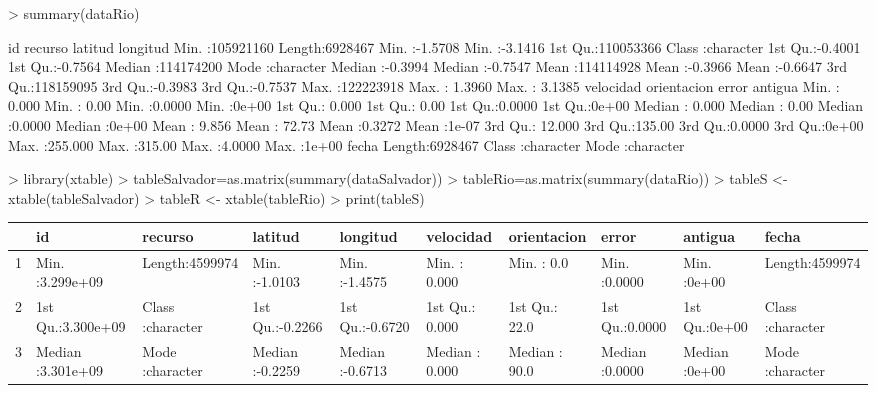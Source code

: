 \documentclass{article}
\begin{document}
\begin{Schunk}
\begin{Sinput}
> summary(dataRio)
\end{Sinput}
\begin{Soutput}
       id              recurso             latitud           longitud      
 Min.   :105921160   Length:6928467     Min.   :-1.5708   Min.   :-3.1416  
 1st Qu.:110053366   Class :character   1st Qu.:-0.4001   1st Qu.:-0.7564  
 Median :114174200   Mode  :character   Median :-0.3994   Median :-0.7547  
 Mean   :114114928                      Mean   :-0.3966   Mean   :-0.6647  
 3rd Qu.:118159095                      3rd Qu.:-0.3983   3rd Qu.:-0.7537  
 Max.   :122223918                      Max.   : 1.3960   Max.   : 3.1385  
   velocidad        orientacion         error           antigua     
 Min.   :  0.000   Min.   :  0.00   Min.   :0.0000   Min.   :0e+00  
 1st Qu.:  0.000   1st Qu.:  0.00   1st Qu.:0.0000   1st Qu.:0e+00  
 Median :  0.000   Median :  0.00   Median :0.0000   Median :0e+00  
 Mean   :  9.856   Mean   : 72.73   Mean   :0.3272   Mean   :1e-07  
 3rd Qu.: 12.000   3rd Qu.:135.00   3rd Qu.:0.0000   3rd Qu.:0e+00  
 Max.   :255.000   Max.   :315.00   Max.   :4.0000   Max.   :1e+00  
    fecha          
 Length:6928467    
 Class :character  
 Mode  :character  
\end{Soutput}
\begin{Sinput}
> library(xtable)
> tableSalvador=as.matrix(summary(dataSalvador))
> tableRio=as.matrix(summary(dataRio))
> tableS <- xtable(tableSalvador)
> tableR <- xtable(tableRio)
> print(tableS)
\end{Sinput}
\begin{Soutput}
% latex table generated in R 3.1.2 by xtable 1.7-4 package
% Thu Jul 16 19:05:09 2015
\begin{table}[ht]
\centering
\begin{tabular}{rlllllllll}
  \hline
 &       id &   recurso &    latitud &    longitud &   velocidad &  orientacion &     error &    antigua &    fecha \\ 
  \hline
1 & Min.   :3.299e+09   & Length:4599974     & Min.   :-1.0103   & Min.   :-1.4575   & Min.   :  0.000   & Min.   :  0.0   & Min.   :0.0000   & Min.   :0e+00   & Length:4599974     \\ 
  2 & 1st Qu.:3.300e+09   & Class :character   & 1st Qu.:-0.2266   & 1st Qu.:-0.6720   & 1st Qu.:  0.000   & 1st Qu.: 22.0   & 1st Qu.:0.0000   & 1st Qu.:0e+00   & Class :character   \\ 
  3 & Median :3.301e+09   & Mode  :character   & Median :-0.2259   & Median :-0.6713   & Median :  0.000   & Median : 90.0   & Median :0.0000   & Median :0e+00   & Mode  :character   \\ 

\end{tabular}
\end{table}
\end{Soutput}
\end{Schunk}
\end{document}
